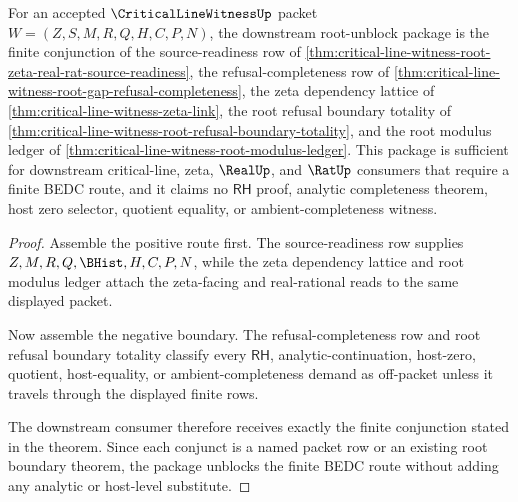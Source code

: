 \begin{theorem}
\label{thm:critical-line-witness-root-downstream-unblock-package}
For an accepted $\CriticalLineWitnessUp$ packet $W=(Z,S,M,R,Q,H,C,P,N)$, the downstream root-unblock package is the finite conjunction of the source-readiness row of \autoref{thm:critical-line-witness-root-zeta-real-rat-source-readiness}, the refusal-completeness row of \autoref{thm:critical-line-witness-root-gap-refusal-completeness}, the zeta dependency lattice of \autoref{thm:critical-line-witness-zeta-link}, the root refusal boundary totality of \autoref{thm:critical-line-witness-root-refusal-boundary-totality}, and the root modulus ledger of \autoref{thm:critical-line-witness-root-modulus-ledger}. This package is sufficient for downstream critical-line, zeta, $\RealUp$, and $\RatUp$ consumers that require a finite BEDC route, and it claims no $\mathsf{RH}$ proof, analytic completeness theorem, host zero selector, quotient equality, or ambient-completeness witness.
\end{theorem}
\begin{proof}
Assemble the positive route first. The source-readiness row supplies $Z,M,R,Q,\BHist,H,C,P,N$, while the zeta dependency lattice and root modulus ledger attach the zeta-facing and real-rational reads to the same displayed packet.

Now assemble the negative boundary. The refusal-completeness row and root refusal boundary totality classify every $\mathsf{RH}$, analytic-continuation, host-zero, quotient, host-equality, or ambient-completeness demand as off-packet unless it travels through the displayed finite rows.

The downstream consumer therefore receives exactly the finite conjunction stated in the theorem. Since each conjunct is a named packet row or an existing root boundary theorem, the package unblocks the finite BEDC route without adding any analytic or host-level substitute.
\end{proof}

